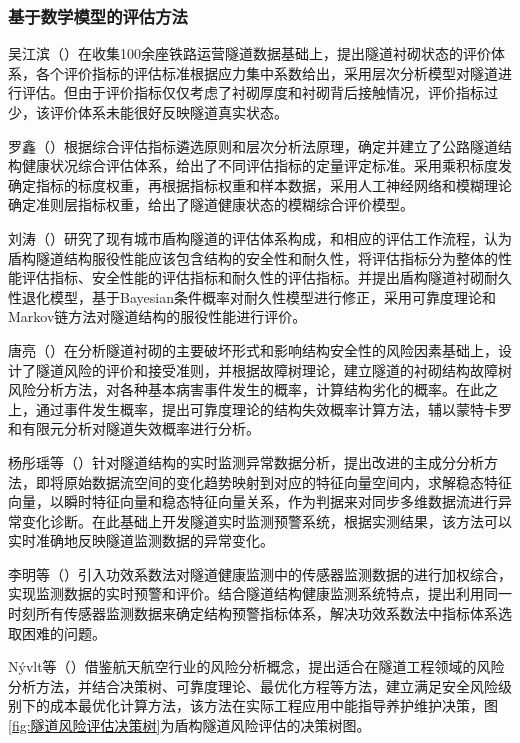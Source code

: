 \subsubsection{基于数学模型的评估方法}

吴江滨（\citeyear{吴江滨2004铁路运营隧道衬砌状态评估体系的建立及工程应用研究}）在收集100余座铁路运营隧道数据基础上，提出隧道衬砌状态的评价体系，各个评价指标的评估标准根据应力集中系数给出，采用层次分析模型对隧道进行评估。但由于评价指标仅仅考虑了衬砌厚度和衬砌背后接触情况，评价指标过少，该评价体系未能很好反映隧道真实状态。

罗鑫（\citeyear{罗鑫2008公路隧道健康状态评估方法及系统研究}）根据综合评估指标遴选原则和层次分析法原理，确定并建立了公路隧道结构健康状况综合评估体系，给出了不同评估指标的定量评定标准。采用乘积标度发确定指标的标度权重，再根据指标权重和样本数据，采用人工神经网络和模糊理论确定准则层指标权重，给出了隧道健康状态的模糊综合评价模型。

刘涛（\citeyear{刘涛2008既有盾构隧道结构性能评价研究}）研究了现有城市盾构隧道的评估体系构成，和相应的评估工作流程，认为盾构隧道结构服役性能应该包含结构的安全性和耐久性，将评估指标分为整体的性能评估指标、安全性能的评估指标和耐久性的评估指标。并提出盾构隧道衬砌耐久性退化模型，基于Bayesian条件概率对耐久性模型进行修正，采用可靠度理论和Markov链方法对隧道结构的服役性能进行评价。

唐亮（\citeyear{唐亮2008隧道病害调查分析及衬砌结构的风险分析与控制研究}）在分析隧道衬砌的主要破坏形式和影响结构安全性的风险因素基础上，设计了隧道风险的评价和接受准则，并根据故障树理论，建立隧道的衬砌结构故障树风险分析方法，对各种基本病害事件发生的概率，计算结构劣化的概率。在此之上，通过事件发生概率，提出可靠度理论的结构失效概率计算方法，辅以蒙特卡罗和有限元分析对隧道失效概率进行分析。

杨彤瑶等（\citeyear{杨彤瑶2013基于改进主元分析方法的隧道应变实时监测预警系统}）针对隧道结构的实时监测异常数据分析，提出改进的主成分分析方法，即将原始数据流空间的变化趋势映射到对应的特征向量空间内，求解稳态特征向量，以瞬时特征向量和稳态特征向量关系，作为判据来对同步多维数据流进行异常变化诊断。在此基础上开发隧道实时监测预警系统，根据实测结果，该方法可以实时准确地反映隧道监测数据的异常变化。

李明等（\citeyear{李明2015基于功效系数法的隧道结构健康监测系统预警研究}）引入功效系数法对隧道健康监测中的传感器监测数据的进行加权综合，实现监测数据的实时预警和评价。结合隧道结构健康监测系统特点，提出利用同一时刻所有传感器监测数据来确定结构预警指标体系，解决功效系数法中指标体系选取困难的问题。

Nývlt等（\citeyear{N2011Probabilistic}）借鉴航天航空行业的风险分析概念，提出适合在隧道工程领域的风险分析方法，并结合决策树、可靠度理论、最优化方程等方法，建立满足安全风险级别下的成本最优化计算方法，该方法在实际工程应用中能指导养护维护决策，图\ref{fig:隧道风险评估决策树}为盾构隧道风险评估的决策树图。

